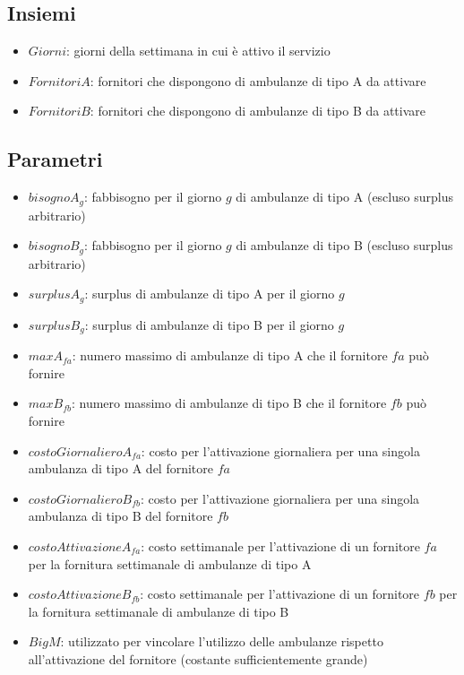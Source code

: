 \subsection{Insiemi}
\begin{itemize}
    \item $Giorni$: giorni della settimana in cui è attivo il servizio
    \item $FornitoriA$: fornitori che dispongono di ambulanze di tipo A da attivare
    \item $FornitoriB$: fornitori che dispongono di ambulanze di tipo B da attivare
\end{itemize}
\subsection{Parametri}
\begin{itemize}
    \item $bisognoA_{g}$: fabbisogno per il giorno $g$ di ambulanze di tipo A (escluso surplus arbitrario)
    \item $bisognoB_{g}$: fabbisogno per il giorno $g$ di ambulanze di tipo B (escluso surplus arbitrario)
    \item $surplusA_{g}$: surplus di ambulanze di tipo A per il giorno $g$
    \item $surplusB_{g}$: surplus di ambulanze di tipo B per il giorno $g$
    \item $maxA_{fa}$: numero massimo di ambulanze di tipo A che il fornitore $fa$ può fornire
    \item $maxB_{fb}$: numero massimo di ambulanze di tipo B che il fornitore $fb$ può fornire
    \item $costoGiornalieroA_{fa}$: costo per l'attivazione giornaliera per una singola ambulanza di tipo A del fornitore $fa$
    \item $costoGiornalieroB_{fb}$: costo per l'attivazione giornaliera per una singola ambulanza di tipo B del fornitore $fb$
    \item $costoAttivazioneA_{fa}$: costo settimanale per l'attivazione di un fornitore $fa$ per la fornitura settimanale di ambulanze di tipo A
    \item $costoAttivazioneB_{fb}$: costo settimanale per l'attivazione di un fornitore $fb$ per la fornitura settimanale di ambulanze di tipo B
    \item $BigM$: utilizzato per vincolare l'utilizzo delle ambulanze rispetto all'attivazione del fornitore (costante sufficientemente grande)
\end{itemize}
